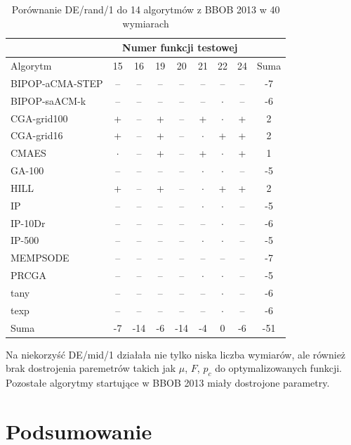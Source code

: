 \documentclass[a4paper,onecolumn,oneside,12pt,wide,floatssmall]{mwrep}
\theoremstyle{definition}
\theoremstyle{plain}%
\theoremstyle{remark}
\begin{document}
\begin{table}[H]
\centering
\begin{tabular}{ | l | c | c | c | c | c | c | c | c | }
\hline		 & \multicolumn{7}{c|}{Numer funkcji testowej} & \\  \hline
Algorytm         &15& 16& 19& 20& 21& 22& 24 & Suma \\  \hline
BIPOP-aCMA-STEP	 & -- & -- & -- & -- & -- & -- & -- & -7 \\
BIPOP-saACM-k	 & -- & -- & -- & -- & -- & $\cdot$ & -- & -6 \\
CGA-grid100	 & + & -- & + & -- & + & $\cdot$ & + & 2 \\
CGA-grid16	 & + & -- & + & -- & $\cdot$ & + & + & 2\\
CMAES	 & $\cdot$ & -- & + & -- & + & $\cdot$ & + & 1 \\
GA-100	 & -- & -- & -- & -- & $\cdot$ & $\cdot$ & -- & -5 \\
HILL	 & + & -- & + & -- & $\cdot$ & + & + & 2 \\
IP	 & -- & -- & -- & -- & $\cdot$ & $\cdot$ & -- & -5 \\
IP-10Dr	 & -- & -- & -- & -- & -- & $\cdot$ & -- & -6 \\
IP-500	 & -- & -- & -- & -- & $\cdot$ & $\cdot$ & -- & -5\\
MEMPSODE	 & -- & -- & -- & -- & -- & -- & -- & -7 \\
PRCGA	 & -- & -- & -- & -- & $\cdot$ & $\cdot$ & -- & -5\\
tany	 & -- & -- & -- & -- & -- & $\cdot$ & -- & -6 \\
texp	 & -- & -- & -- & -- & -- & $\cdot$ & -- & -6 \\ \hline
Suma     & -7 & -14 & -6 & -14 & -4 & 0 & -6 & -51 \\ \hline
\end{tabular}
\caption{Porównanie DE/rand/1 do 14 algorytmów z BBOB 2013 w 40 wymiarach}
\label{table:bbob2013rand40}
\end{table}

Na niekorzyść DE/mid/1 działała nie tylko niska liczba wymiarów, ale również brak dostrojenia
paremetrów takich jak $\mu$, $F$, $p_c$ do optymalizowanych funkcji. Pozostałe algorytmy startujące
w BBOB 2013 miały dostrojone parametry.

\chapter{Podsumowanie}
\end{document}
